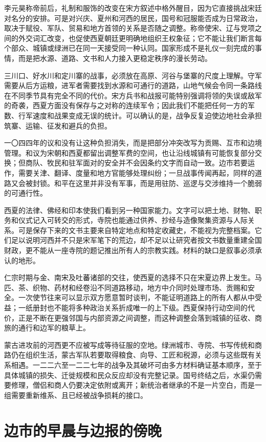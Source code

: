 李元昊称帝前后，礼制和服饰的改变在宋方叙述中格外醒目，因为它直接挑战宋廷对名分的安排。可是对兴庆、夏州和河西的居民，国号和冠服能否成为日常政治，取决于赋役、军队、贸易和地方首领的关系是否随之调整。称帝使宋、辽与党项之间的外交词汇改变，也促使西夏朝廷更明确地组织王权象征；它不能让我们断言每个部众、城镇或绿洲已在同一天接受同一种认同。国家形成不是礼仪一刻完成的事情，而是把水源、道路、文书和人力接入更稳定秩序的漫长劳动。

三川口、好水川和定川寨的战事，必须放在高原、河谷与堡寨的尺度上理解。守军需要从后方运粮，进军者需要找到水源和可通行的道路，山地气候会令同一条路线在不同季节具有完全不同的代价。宋方兵书和战报可能特别强调将领的失误或敌军的奇袭，西夏方面没有保存与之对称的连续军令；因此我们不能把任何一方的军数、行军速度和战果变成无误的统计。可以确认的是，战争反复迫使边地社会承担筑寨、运输、征发和避兵的负担。

一〇四四年的议和没有让这种负担消失，而是把部分冲突改写为贡赐、互市和边境管理。和议为宋朝和西夏都留出调整军费的空间，也让沿线城镇有可能恢复部分交换；但商队、牧民和驻军面对的安全并不会因条约文字而自动一致。边市若要运作，需要关津、翻译、度量和地方官能够处理纠纷；一旦战事传闻再起，同样的道路又会被封锁。和平在这里并非没有军事，而是用驻防、巡逻与交涉维持一个脆弱的可通行性。

西夏的法律、佛经和印本使我们看到另一种国家能力。文字可以把土地、财物、职务和仪式记入可转交的形式，寺院也能通过供养、抄经与造像聚集资源与人际关系。可是保存下来的文书主要来自特定地点和特定收藏史，不能视为完整档案。它们足以说明河西并不只是宋军笔下的荒边，却不足以让研究者按文书数量重建全国财政，更不能从一座寺院的题记推出所有人的宗教实践。材料的缺口是叙事必须承认的地形。

仁宗时期与金、南宋及吐蕃诸部的交往，使西夏的选择不只在宋夏边界上发生。马匹、茶、织物、药材和经卷沿不同道路移动，地方中介同时处理市场、贡赐和安全。一次使节往来可以显示双方愿意暂时谈判，不能证明道路上的所有人都从中受益；一纸册封也不能将多种政治关系折成唯一的上下级。西夏保持行动空间的代价，正是不断在更强邻国与内部资源之间调整，而这种调整会落到城镇的征收、商旅的通行和边军的粮草上。

蒙古进攻前的河西更不应被写成等待征服的空地。绿洲城市、寺院、书写传统和商路仍在组织生活，蒙古军队若要取得粮食、向导、工匠和税源，必须与这些既有关系相遇。一二二六至一二二七年的战争及其破坏可由多方材料确证基本顺序，至于具体城镇的损失、迁徙规模和民众反应却没有完整记录。国号终结之后，水渠仍需要修理，僧侣和商人仍要决定依附或离开；新统治者继承的不是一片空白，而是一组需要重新维系、且已经被战争损耗的接口。

\section{边市的早晨与边报的傍晚}

